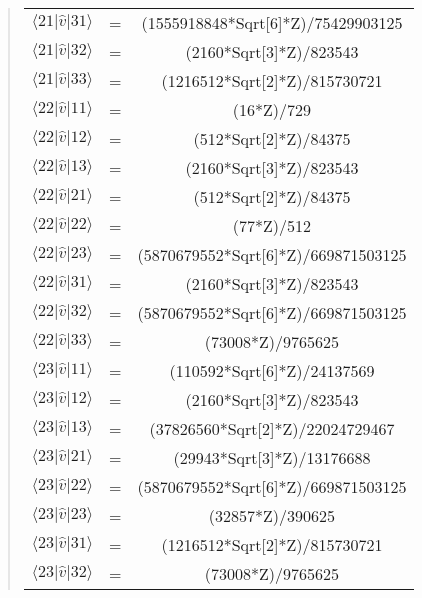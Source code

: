 \documentclass[%
oneside,                 %
final,                   %
10pt]{article}
\newenvironment{doconceexercise}{}{}
\begin{document}
\begin{doconceexercise}
\begin{quote}
\begin{tabular}{ccc}
$\langle 21\vert \hat{v} \vert 31\rangle$ & = & (1555918848*Sqrt[6]*Z)/75429903125     \\
$\langle 21\vert \hat{v} \vert 32\rangle$ & = & (2160*Sqrt[3]*Z)/823543                \\
$\langle 21\vert \hat{v} \vert 33\rangle$ & = & (1216512*Sqrt[2]*Z)/815730721          \\
$\langle 22\vert \hat{v} \vert 11\rangle$ & = & (16*Z)/729                             \\
$\langle 22\vert \hat{v} \vert 12\rangle$ & = & (512*Sqrt[2]*Z)/84375                  \\
$\langle 22\vert \hat{v} \vert 13\rangle$ & = & (2160*Sqrt[3]*Z)/823543                \\
$\langle 22\vert \hat{v} \vert 21\rangle$ & = & (512*Sqrt[2]*Z)/84375                  \\
$\langle 22\vert \hat{v} \vert 22\rangle$ & = & (77*Z)/512                             \\
$\langle 22\vert \hat{v} \vert 23\rangle$ & = & (5870679552*Sqrt[6]*Z)/669871503125    \\
$\langle 22\vert \hat{v} \vert 31\rangle$ & = & (2160*Sqrt[3]*Z)/823543                \\
$\langle 22\vert \hat{v} \vert 32\rangle$ & = & (5870679552*Sqrt[6]*Z)/669871503125    \\
$\langle 22\vert \hat{v} \vert 33\rangle$ & = & (73008*Z)/9765625                      \\
$\langle 23\vert \hat{v} \vert 11\rangle$ & = & (110592*Sqrt[6]*Z)/24137569            \\
$\langle 23\vert \hat{v} \vert 12\rangle$ & = & (2160*Sqrt[3]*Z)/823543                \\
$\langle 23\vert \hat{v} \vert 13\rangle$ & = & (37826560*Sqrt[2]*Z)/22024729467       \\
$\langle 23\vert \hat{v} \vert 21\rangle$ & = & (29943*Sqrt[3]*Z)/13176688             \\
$\langle 23\vert \hat{v} \vert 22\rangle$ & = & (5870679552*Sqrt[6]*Z)/669871503125    \\
$\langle 23\vert \hat{v} \vert 23\rangle$ & = & (32857*Z)/390625                       \\
$\langle 23\vert \hat{v} \vert 31\rangle$ & = & (1216512*Sqrt[2]*Z)/815730721          \\
$\langle 23\vert \hat{v} \vert 32\rangle$ & = & (73008*Z)/9765625                      \\

\end{tabular}
\end{quote}
\end{doconceexercise}
\end{document}
